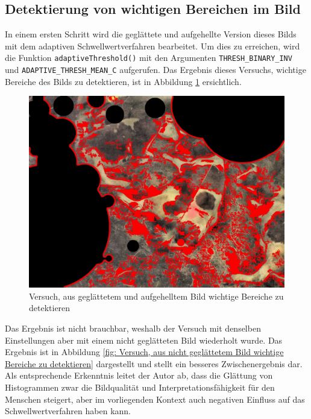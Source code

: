 \subsection{Detektierung von wichtigen Bereichen im Bild}



In einem ersten Schritt wird die geglättete und aufgehellte Version dieses Bilds mit dem adaptiven Schwellwertverfahren bearbeitet. Um dies zu erreichen, wird die Funktion \texttt{adaptiveThreshold()} mit den Argumenten \texttt{THRESH_BINARY_INV} und \texttt{ADAPTIVE_THRESH_MEAN_C} aufgerufen. Das Ergebnis dieses Versuchs, wichtige Bereiche des Bilds zu detektieren, ist in Abbildung \ref{fig: Versuch, aus geglättetem und aufgehelltem Bild wichtige Bereiche zu detektieren} ersichtlich. 

\begin{figure}[H]
	\center
	\includegraphics[scale=0.43]{Grafiken/entwicklung/10thresholdedEqualizedBirghtened.jpg}
	\caption{Versuch, aus geglättetem und aufgehelltem Bild wichtige Bereiche zu detektieren} 
	\label{fig: Versuch, aus geglättetem und aufgehelltem Bild wichtige Bereiche zu detektieren} 
\end{figure}

Das Ergebnis ist nicht brauchbar, weshalb der Versuch mit denselben Einstellungen aber mit einem nicht geglätteten Bild wiederholt wurde. Das Ergebnis ist in Abbildung \ref{fig: Versuch, aus nicht geglättetem Bild wichtige Bereiche zu detektieren} dargestellt und stellt ein besseres Zwischenergebnis dar. Als entsprechende Erkenntnis leitet der Autor ab, dass die Glättung von Histogrammen zwar die Bildqualität und Interpretationsfähigkeit für den Menschen steigert, aber im vorliegenden Kontext auch negativen Einfluss auf das Schwellwertverfahren haben kann.

